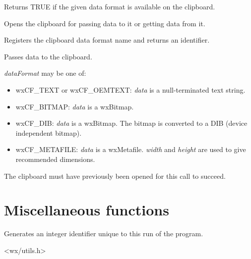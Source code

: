 
Returns TRUE if the given data format is available on the clipboard.



Opens the clipboard for passing data to it or getting data from it.



Registers the clipboard data format name and returns an identifier.



Passes data to the clipboard.

{\it dataFormat} may be one of:

\begin{itemize}\itemsep=0pt
\item wxCF\_TEXT or wxCF\_OEMTEXT: {\it data} is a null-terminated text string.
\item wxCF\_BITMAP: {\it data} is a wxBitmap.
\item wxCF\_DIB: {\it data} is a wxBitmap. The bitmap is converted to a DIB (device independent bitmap).
\item wxCF\_METAFILE: {\it data} is a wxMetafile. {\it width} and {\it height} are used to give recommended dimensions.
\end{itemize}

The clipboard must have previously been opened for this call to succeed.

\section{Miscellaneous functions}\label{miscellany}



Generates an integer identifier unique to this run of the program.


<wx/utils.h>


